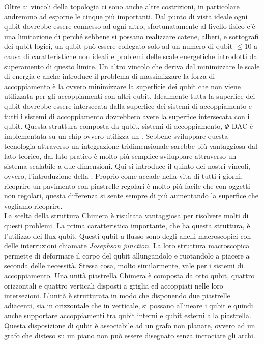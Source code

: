 Oltre ai vincoli della topologia ci sono anche altre costrizioni, in particolare andremmo ad esporne le cinque più importanti. Dal punto di vista ideale ogni qubit dovrebbe essere connesso ad ogni altro, sfortunatamente al livello fisico c'è una limitazione di  perché sebbene si possano realizzare catene, alberi, e sottografi dei qubit logici, un qubit può essere collegato solo ad un numero di qubit $\le 10$ a causa di caratteristiche non ideali e problemi delle scale energetiche introdotti dal superamento di questo limite. Un altro vincolo che deriva dal minimizzare le scale di energia e anche introduce il problema di massimizzare la forza di accoppiamento è la  ovvero minimizzare la superficie dei qubit che non viene utilizzata per gli accoppiamenti con altri qubit. Idealmente tutta la superfice dei qubit dovrebbe essere intersecata dalla superfice dei sistemi di accoppiamento e tutti i sistemi di accoppiamento dovrebbero avere la superfice intersecata con i qubit. Questa struttura composta da qubit, sistemi di accoppiamento, $\Phi$-DAC è implementata su un chip ovvero utilizza un . Sebbene sviluppare questa tecnologia attraverso un integrazione tridimensionale sarebbe più vantaggiosa dal lato teorico, dal lato pratico è molto più semplice sviluppare attraverso un sistema scalabile a due dimensioni. Qui si introduce il quinto dei nostri vincoli, ovvero, l'introduzione della . Proprio come accade nella vita di tutti i giorni, ricoprire un pavimento con piastrelle regolari è molto più facile che con oggetti non regolari, questa differenza si sente sempre di più aumentando la superfice che vogliamo ricoprire.\\
La scelta della struttura Chimera è risultata vantaggiosa per risolvere molti di questi problemi. La prima caratteristica importante, che ha questa struttura, è l'utilizzo dei flux qubit. Questi qubit a flusso sono degli anelli macroscopici con delle interruzioni chiamate \textit{Josephson junction}. La loro struttura macroscopica permette di deformare il corpo del qubit allungandolo e ruotandolo a piacere a seconda delle necessità. Stessa cosa, molto similarmente, vale per i sistemi di accoppiamento. Una unità piastrella Chimera è composta da otto qubit, quattro orizzontali e quattro verticali disposti a griglia ed accoppiati nelle loro intersezioni. L'unità è strutturata in modo che disponendo due piastrelle adiacenti, sia in orizzontale che in verticale, si possano allineare i qubit e quindi anche supportare accoppiamenti tra qubit interni e qubit esterni alla piastrella. Questa disposizione di qubit è associabile ad un grafo non planare, ovvero ad un grafo che disteso su un piano non può essere disegnato senza incrociare gli archi.
